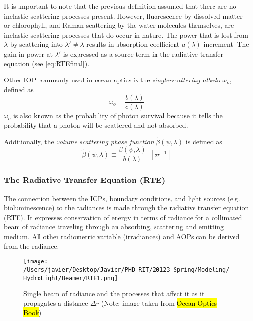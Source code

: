 It is important to note that the previous definition assumed that there are no inelastic-scattering processes present. However, fluorescence by dissolved matter or chlorophyll, and Raman scattering by the water molecules themselves, are inelastic-scattering processes that do occur in nature. The power that is lost from $\lambda$ by scattering into $\lambda'\neq\lambda$ results in absorption coefficient $a(\lambda)$ increment. The gain in power at $\lambda'$ is expressed as a source term in the radiative transfer equation (see \autoref{eq:RTEfinal}).

Other IOP commonly used in ocean optics is the {\it single-scattering albedo}  $\omega_o$, defined as
\begin{equation}
  \omega_o=\frac{b(\lambda)}{c(\lambda)}
\end{equation}
$\omega_o$ is also known as the probability of photon survival because it tells the probability that a photon will be scattered and not absorbed.

Additionally, the {\it volume scattering phase function} $\tilde{\beta}(\psi,\lambda)$  is defined as
\begin{equation}
  \tilde{\beta}(\psi,\lambda)\equiv \frac{\beta(\psi,\lambda)}{b(\lambda)}~~\left[sr^{-1} \right]
\end{equation}

\subsubsection*{The Radiative Transfer Equation (RTE)}
The connection between the IOPs, boundary conditions, and light sources (e.g. bioluminescence) to the radiances is made through the radiative transfer equation (RTE). It expresses conservation of energy in terms of radiance for a collimated beam of radiance traveling through an absorbing, scattering and emitting medium. All other radiometric variable (irradiances) and AOPs can be derived from the radiance.

\begin{figure}[htb]
\centering
      \texttt{[image: /Users/javier/Desktop/Javier/PHD\_RIT/20123\_Spring/Modeling/HydroLight/Beamer/RTE1.png]}
      \caption{Single beam of radiance and the processes that affect it as it propagates a distance $\Delta r$ (Note: image taken from \hl{Ocean Optics Book})}
      \label{fig:RTE1}
\end{figure}

